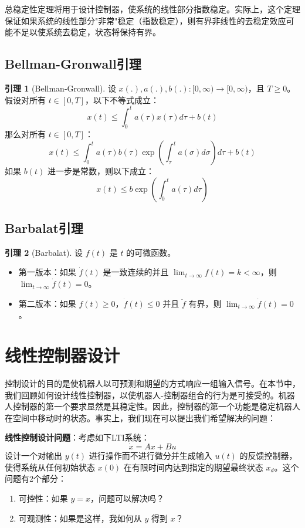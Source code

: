 \documentclass[UTF8,12pt,a4paper]{ctexart}
\theoremstyle{definition}
\newtheorem{lemma}{引理}[section]
\begin{document}
总稳定性定理将用于设计控制器，使系统的线性部分指数稳定。实际上，这个定理保证如果系统的线性部分"非常"稳定（指数稳定），则有界非线性的去稳定效应可能不足以使系统去稳定，状态将保持有界。

\subsection{Bellman-Gronwall引理}

\begin{lemma}[Bellman-Gronwall]
设 $x(.), a(.), b(.): [0, \infty) \rightarrow [0, \infty)$，且 $T \geq 0$。假设对所有 $t \in [0, T]$，以下不等式成立：
\[
x(t) \leq \int_0^t a(\tau)x(\tau)d\tau + b(t)
\]
那么对所有 $t \in [0, T]$：
\[
x(t) \leq \int_0^t a(\tau)b(\tau)\exp\left(\int_\tau^t a(\sigma)d\sigma\right)d\tau + b(t)
\]
如果 $b(t)$ 进一步是常数，则以下成立：
\[
x(t) \leq b \exp\left(\int_0^t a(\tau)d\tau\right)
\]
\end{lemma}

\subsection{Barbalat引理}

\begin{lemma}[Barbalat]
设 $f(t)$ 是 $t$ 的可微函数。
\begin{itemize}
\item 第一版本：如果 $\dot{f}(t)$ 是一致连续的并且 $\lim_{t \rightarrow \infty} f(t) = k < \infty$，则 $\lim_{t \rightarrow \infty} \dot{f}(t) = 0$。
\item 第二版本：如果 $f(t) \geq 0$，$\dot{f}(t) \leq 0$ 并且 $\ddot{f}$ 有界，则 $\lim_{t \rightarrow \infty} \dot{f}(t) = 0$。
\end{itemize}
\end{lemma}

\section{线性控制器设计}

控制设计的目的是使机器人以可预测和期望的方式响应一组输入信号。在本节中，我们回顾如何设计线性控制器，以使机器人-控制器组合的行为是可接受的。机器人控制器的第一个要求显然是其稳定性。因此，控制器的第一个功能是稳定机器人在空间中移动时的状态。事实上，我们现在可以提出我们希望解决的问题：

\textbf{线性控制设计问题}：考虑如下LTI系统：
\begin{equation}\label{eq:2.11.1}
\dot{x} = Ax + Bu
\end{equation}
设计一个对输出 $y(t)$ 进行操作而不进行微分并生成输入 $u(t)$ 的反馈控制器，使得系统从任何初始状态 $x(0)$ 在有限时间内达到指定的期望最终状态 $x_d$。这个问题有2个部分：
\begin{enumerate}
\item 可控性：如果 $y=x$，问题可以解决吗？
\item 可观测性：如果是这样，我如何从 $y$ 得到 $x$？
\end{enumerate}
\end{document}
